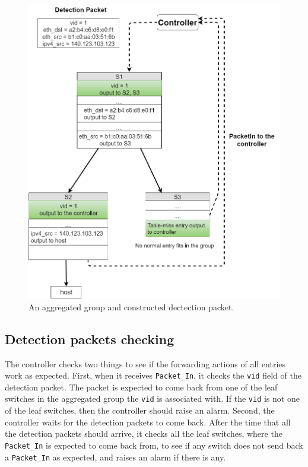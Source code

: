 \begin{figure}[H]
\begin{center}
\includegraphics[width=1\textwidth]{figures/aggregated_group.png}
\end{center}
\caption{An aggregated group and constructed dectection packet. \sout{}}
\label{aggregated_group}
\end{figure}

\subsection{Detection packets checking}
The controller checks two things to see if the forwarding actions of all entries work as expected. First, when it receives \texttt{Packet\_In}, it checks the \texttt{vid} field of the detection packet. The packet is expected to come back from one of the leaf switches in the aggregated group the \texttt{vid} is associated with. If the \texttt{vid} is not one of the leaf switches, then the controller should raise an alarm. Second, the controller waits for the detection packets to come back. After the time that all the detection packets should arrive, it checks all the leaf switches, where the \texttt{Packet\_In} is expected to come back from, to see if any switch does not send back a \texttt{Packet\_In} as expected, and raises an alarm if there is any. 

